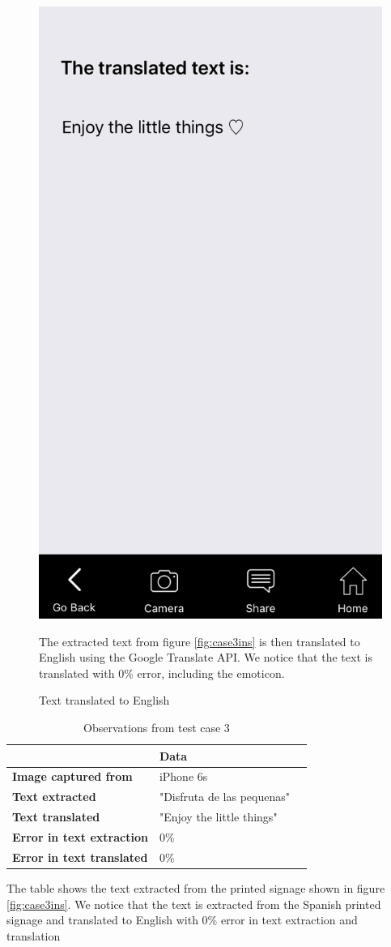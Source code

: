 \documentclass[12pt]{article}
\begin{document}
       \begin{figure}[H]
	\centering
	\includegraphics[width=0.5\linewidth]{media/case3-eng.PNG}
	\caption{Text translated to English}{The extracted text from figure \ref{fig:case3ins} is then translated to English using the Google Translate API. We notice that the text is translated with 0\% error, including the emoticon. }
	\label{fig:eng}
\end{figure} 


\begin{table}%
    \centering
   
    \label{my-label3}
       \begin{tabular}{|p{30mm}|p{55mm}|p{35mm}|}
 \hline
  & \textbf{Data}  \\ [0.5ex] 
 \hline\hline
 \textbf{Image captured from} & iPhone 6s  \\
 \hline
  \textbf{Text extracted} & "Disfruta de las pequenas" \\
 \hline
 \textbf{Text translated} & "Enjoy the little things"   \\
 \hline
 \textbf{Error in text extraction} & 0\%   \\
 \hline
 \textbf{Error in text translated} & 0\%   \\ [1ex] 
 \hline
    \end{tabular}
     \caption{Observations from test case 3} {The table shows the text extracted from the printed signage shown in figure  \ref{fig:case3ins}. We notice that the text is extracted from the Spanish printed signage and translated to English with 0\% error in text extraction and translation}
\end{table}
\end{document}
